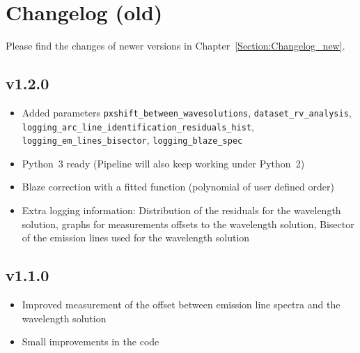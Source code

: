 \documentclass[10pt,a4paper]{article}
\begin{document}


\newpage

\appendix

\section{Changelog (old)}
\label{Section:Changelog_old}
Please find the changes of newer versions in Chapter~\ref{Section:Changelog_new}.

\subsection*{v1.2.0}
\begin{itemize}\setlength\itemsep{0em}
  \item Added parameters \verb|pxshift_between_wavesolutions|, \verb|dataset_rv_analysis|,\\ \verb|logging_arc_line_identification_residuals_hist|, \verb|logging_em_lines_bisector|, \verb|logging_blaze_spec|
  \item Python~3 ready (Pipeline will also keep working under Python~2)
  \item Blaze correction with a fitted function (polynomial of user defined order)
  \item Extra logging information: Distribution of the residuals for the wavelength solution, graphs for measurements offsets to the wavelength solution, Bisector of the emission lines used for the wavelength solution
\end{itemize}

\subsection*{v1.1.0}
\begin{itemize}\setlength\itemsep{0em}
  \item Improved measurement of the offset between emission line spectra and the wavelength solution
  \item Small improvements in the code
\end{itemize}
\end{document}
